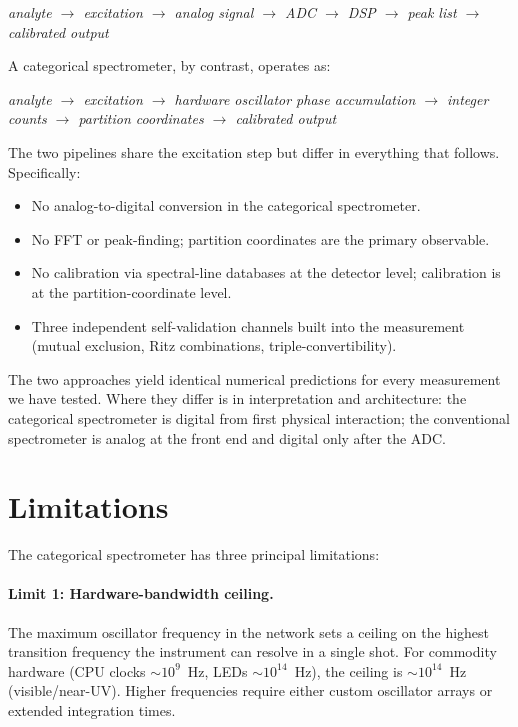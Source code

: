 \documentclass[twocolumn,11pt,a4paper]{article}
\theoremstyle{thmstyle}
\theoremstyle{axiomstyle}
\theoremstyle{definition}
\theoremstyle{remark}
\begin{document}
\begin{center}
\textit{analyte $\to$ excitation $\to$ analog signal $\to$ ADC $\to$ DSP $\to$ peak list $\to$ calibrated output}
\end{center}

A categorical spectrometer, by contrast, operates as:

\begin{center}
\textit{analyte $\to$ excitation $\to$ hardware oscillator phase accumulation $\to$ integer counts $\to$ partition coordinates $\to$ calibrated output}
\end{center}

The two pipelines share the excitation step but differ in everything that follows. Specifically:

\begin{itemize}[nosep]
\item No analog-to-digital conversion in the categorical spectrometer.
\item No FFT or peak-finding; partition coordinates are the primary observable.
\item No calibration via spectral-line databases at the detector level; calibration is at the partition-coordinate level.
\item Three independent self-validation channels built into the measurement (mutual exclusion, Ritz combinations, triple-convertibility).
\end{itemize}

The two approaches yield identical numerical predictions for every measurement we have tested. Where they differ is in interpretation and architecture: the categorical spectrometer is digital from first physical interaction; the conventional spectrometer is analog at the front end and digital only after the ADC.

\section{Limitations}
\label{sec:limitations}

The categorical spectrometer has three principal limitations:

\paragraph{Limit 1: Hardware-bandwidth ceiling.} The maximum oscillator frequency in the network sets a ceiling on the highest transition frequency the instrument can resolve in a single shot. For commodity hardware (CPU clocks $\sim 10^{9}$~Hz, LEDs $\sim 10^{14}$~Hz), the ceiling is $\sim 10^{14}$~Hz (visible/near-UV). Higher frequencies require either custom oscillator arrays or extended integration times.
\end{document}
